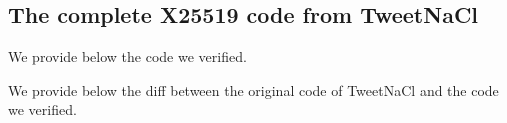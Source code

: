 \subsection{The complete X25519 code from TweetNaCl}
\label{verified-C-and-diff}

 We provide below the code we verified.



 We provide below the diff between the original code of TweetNaCl and the code we verified.


